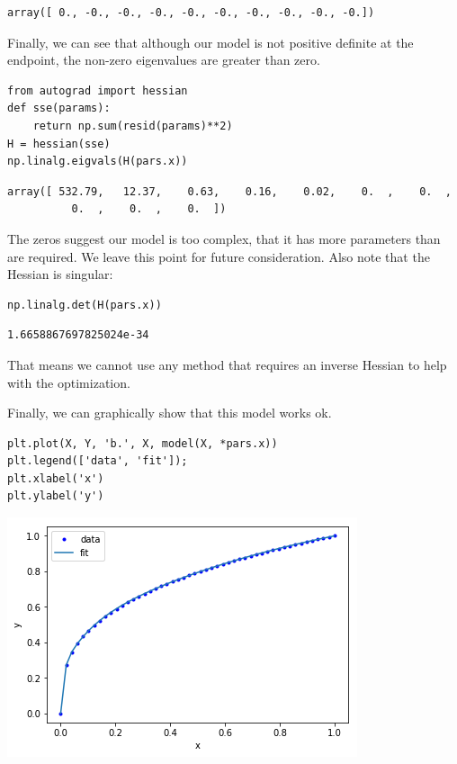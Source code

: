 \documentclass[11pt]{article}
\begin{document}
\begin{verbatim}
array([ 0., -0., -0., -0., -0., -0., -0., -0., -0., -0.])
\end{verbatim}

Finally, we can see that although our model is not positive definite at the endpoint, the non-zero eigenvalues are greater than zero.

\begin{verbatim}
from autograd import hessian
def sse(params):
    return np.sum(resid(params)**2)
H = hessian(sse)
np.linalg.eigvals(H(pars.x))
\end{verbatim}

\begin{verbatim}
array([ 532.79,   12.37,    0.63,    0.16,    0.02,    0.  ,    0.  ,
          0.  ,    0.  ,    0.  ])
\end{verbatim}

The zeros suggest our model is too complex, that it has more parameters than are required. We leave this point for future consideration. Also note that the Hessian is singular:

\begin{verbatim}
np.linalg.det(H(pars.x))
\end{verbatim}

\begin{verbatim}
1.6658867697825024e-34
\end{verbatim}

That means we cannot use any method that requires an inverse Hessian to help with the optimization.

Finally, we can graphically show that this model works ok.

\begin{verbatim}
plt.plot(X, Y, 'b.', X, model(X, *pars.x))
plt.legend(['data', 'fit']);
plt.xlabel('x')
plt.ylabel('y')
\end{verbatim}

\begin{center}
\includegraphics[width=.9\linewidth]{obipy-resources/de048b6a9afb1b9e2b48e7a057512e1e-70304fjU.png}
\end{center}
\end{document}
